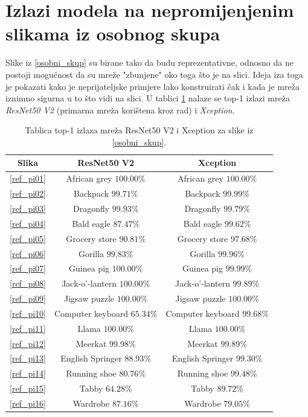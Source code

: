 \documentclass[utf8, diplomski]{fer}
\begin{document}
\section{Izlazi modela na nepromijenjenim slikama iz osobnog skupa}
Slike iz \ref{osobni_skup} su birane tako da budu reprezentativne, odnosno da ne postoji mogućnost da su mreže "zbunjene" oko toga što je na slici. Ideja iza toga je pokazati kako je neprijateljske primjere lako konstruirati čak i kada je mreža iznimno sigurna u to što vidi na slici. U tablici \ref{regular_predictions} nalaze se top-1 izlazi mreža \textit{ResNet50 V2} (primarna mreža korištena kroz rad) i \textit{Xception}.
\\
\bgroup
\def\arraystretch{1.2}
\begin{table}[H]
\begin{tabular}{|c | c | c|}
\hline
Slika & ResNet50 V2 & Xception \\ \hline
\ref{ref_pi01} & African grey $100.00\%$ & African grey $100.00\%$  \\ \hline
\ref{ref_pi02} & Backpack $99.71\%$ & Backpack $99.99\%$ \\ \hline
\ref{ref_pi03} & Dragonfly $99.93\%$ & Dragonfly $99.79\%$ \\ \hline
\ref{ref_pi04} & Bald eagle $87.47\%$ & Bald eagle $99.62\%$ \\  \hline
\ref{ref_pi05} & Grocery store $90.81\%$ & Grocery store $97.68\%$ \\ \hline
\ref{ref_pi06} & Gorilla $99.83\%$ & Gorilla $99.96\%$ \\ \hline
\ref{ref_pi07} & Guinea pig $100.00\%$ & Guinea pig $99.99\%$ \\ \hline
\ref{ref_pi08} & Jack-o'-lantern $100.00\%$ & Jack-o'-lantern $99.89\%$ \\ \hline
\ref{ref_pi09} & Jigsaw puzzle $100.00\%$ & Jigsaw puzzle $100.00\%$ \\ \hline
\ref{ref_pi10} & Computer keyboard $65.34\%$ & Computer keyboard $99.68\%$ \\ \hline
\ref{ref_pi11} & Llama $100.00\%$ & Llama $100.00\%$ \\ \hline
\ref{ref_pi12} & Meerkat $99.98\%$ & Meerkat $99.89\%$ \\ \hline
\ref{ref_pi13} & English Springer $88.93\%$ & English Springer $99.30\%$ \\ \hline
\ref{ref_pi14} & Running shoe $80.76\%$ & Running shoe $99.48\%$ \\ \hline
\ref{ref_pi15} & Tabby $64.28\%$ & Tabby $89.72\%$ \\ \hline
\ref{ref_pi16} & Wardrobe $87.16\%$ & Wardrobe $79.05\%$ \\ \hline
\end{tabular}
\caption{Tablica top-1 izlaza mreža ResNet50 V2 i Xception za slike iz \ref{osobni_skup}.}\label{regular_predictions}
\end{table}
\egroup
\end{document}
